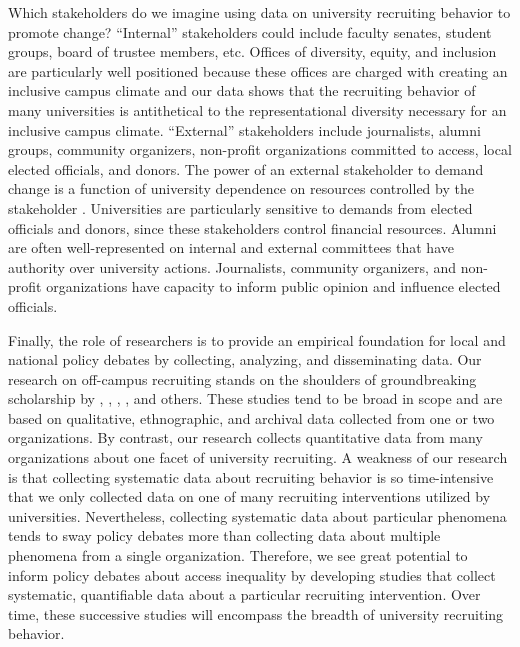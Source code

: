 \documentclass[twoside]{article}
\begin{document}
Which stakeholders do we imagine using data on university recruiting behavior to promote change? ``Internal'' stakeholders could include faculty senates, student groups, board of trustee members, etc. Offices of diversity, equity, and inclusion are particularly well positioned because these offices are charged with creating an inclusive campus climate and our data shows that the recruiting behavior of many universities is antithetical to the representational diversity necessary for an inclusive campus climate.  ``External'' stakeholders include journalists, alumni groups, community organizers, non-profit organizations committed to access, local elected officials, and donors.  The power of an external stakeholder to demand change is a function of university dependence on resources controlled by the stakeholder \citep{RN959}. Universities are particularly sensitive to demands from elected officials and donors, since these stakeholders control financial resources.  Alumni are often well-represented on internal and external committees that have authority over university actions.  Journalists, community organizers, and non-profit organizations have capacity to inform public opinion and influence elected officials.

Finally, the role of researchers is to provide an empirical foundation for local and national policy debates by collecting, analyzing, and disseminating data.  Our research on off-campus recruiting stands on the shoulders of groundbreaking scholarship by \cite{RN1100}, \cite{RN3519}, \cite{RN4407}, \cite{RN4324}, and others.  These studies tend to be broad in scope and are based on qualitative, ethnographic, and archival data collected from one or two organizations. By contrast, our research collects quantitative data from many organizations about one facet of university recruiting. A weakness of our research is that collecting systematic data about recruiting behavior is so time-intensive that we only collected data on one of many recruiting interventions utilized by universities. Nevertheless, collecting systematic data about particular phenomena tends to sway policy debates more than collecting data about multiple phenomena from a single organization. Therefore, we see great potential to inform policy debates about access inequality by developing studies that collect systematic, quantifiable data about a particular recruiting intervention. Over time, these successive studies will encompass the breadth of university recruiting behavior.  
\end{document}
